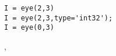 \begin{examples}
\begin{Verbatim}
I = eye(2,3) 
I = eye(2,3,type='int32');
I = eye(0,3)
\end{Verbatim} 

\end{examples}

\begin{manseealso}
, 
\end{manseealso}

